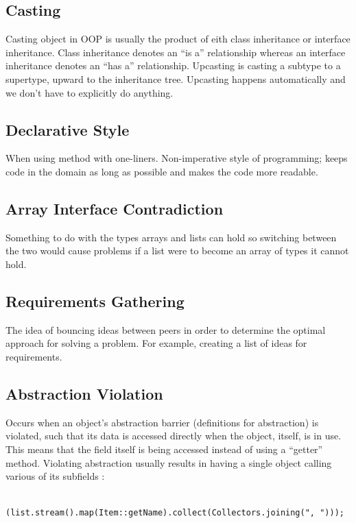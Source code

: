 \documentclass[a4paper, 11pt]{article}
\begin{document}
    \subsection{Casting}
        Casting object in OOP is usually the product of eith class inheritance or interface inheritance.   Class inheritance denotes an “is a” relationship whereas an interface inheritance denotes an “has a” relationship.
        \newline\newline
        Upcasting is casting a subtype to a supertype, upward to the inheritance tree. Upcasting happens automatically and we don’t have to explicitly do anything.

    \subsection{Declarative Style}
        When using method with one-liners. Non-imperative style of programming; keeps code in the domain as long as possible and makes the code more readable.

    \subsection{Array Interface Contradiction}
        Something to do with the types arrays and lists can hold so switching between the two would cause problems if a list were to become an array of types it cannot hold.

    \subsection{Requirements Gathering}
        The idea of bouncing ideas between peers in order to determine the optimal approach for solving a problem.  For example, creating a list of ideas for requirements.

    \subsection{Abstraction Violation}
        Occurs when an object’s abstraction barrier (definitions for abstraction) is violated, such that its data is accessed directly when the object, itself, is in use.  This means that the field itself is being accessed instead of using a “getter” method.  Violating abstraction usually results in having a single object calling various of its subfields :
        \begin{lstlisting}
        (list.stream().map(Item::getName).collect(Collectors.joining(", ")));
        \end{lstlisting}
\end{document}
